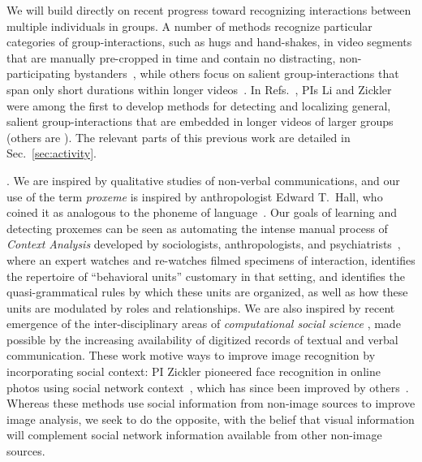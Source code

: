 We will build directly on recent progress toward recognizing interactions between multiple individuals in groups. A number of methods recognize particular categories of group-interactions, such as hugs and hand-shakes, in video segments that are manually pre-cropped in time and contain no distracting, non-participating bystanders~\cite{Intille:act,Patron-PerezMRZ12,PrabhakarR12}, while others focus on salient group-interactions that span only short durations within longer videos~\cite{Hongeng:act,Hakeem:act,Choi:recogtrack, Ryoo:group, Regh2013}. In Refs.~\cite{groupdet2013,LiIJCV2012,Li2010}, PIs Li and Zickler were among the first  to develop methods  for detecting and localizing general, salient group-interactions that are embedded in longer videos of larger groups (others are \cite{Cristani:fformation,Amer:group}). The  relevant parts of this previous work are detailed in Sec.~\ref{sec:activity}.


. We are inspired by qualitative studies of non-verbal communications, and our use of the term \emph{proxeme} is inspired by anthropologist Edward T.~Hall, who coined it as analogous to the phoneme of language~\cite{hall1974}. Our goals of learning and detecting proxemes can be seen as automating the intense manual process of \emph{Context Analysis} developed by sociologists, anthropologists, and psychiatrists~\cite{Kendon1990}, where an expert watches and re-watches filmed specimens of interaction, identifies the repertoire of ``behavioral units'' customary in that setting, and identifies the quasi-grammatical rules by which these units are organized, as well as how these units are modulated by roles and relationships. We are also inspired by recent emergence of the inter-disciplinary areas of \emph{computational social science} \cite{Lazer2009,Pantic}, made possible by the increasing availability of digitized records of textual and verbal communication. These work motive ways to improve image recognition by incorporating social context: PI Zickler pioneered face recognition in online photos using social network context~\cite{Stone2008,Stone2010}, which has since been improved by others~\cite{Dikmen:classify,Poppe2012,LeeBMVC2011,hanalbum2013album}.  Whereas these methods use social information from non-image sources to improve image analysis, we seek to do the opposite, with the belief that visual information will complement social network information available from other non-image sources. 

